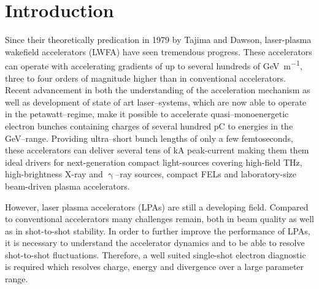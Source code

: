 \documentclass[%
preprint,
amsmath,
amssymb,
aip,
rsi, 
numerical,
floatfix,
]{revtex4-1}
\newcommand{\myCite}[1]{\textcolor{blue}{\cite{#1}}}
\begin{document}
\maketitle



\section{\label{Mot} Introduction}

Since their theoretically predication in 1979 by Tajima and Dawson\myCite{Tajima1979}, laser-plasma wakefield accelerators (LWFA) have seen tremendous progress. 
These accelerators can operate with accelerating gradients of up to several hundreds of \si{\giga\electronvolt\per\meter}, three to four orders of magnitude higher than in conventional accelerators.  
Recent advancement in both the understanding of the acceleration mechanism as well as development of state of art laser--systems, which are now able to operate in the petawatt--regime\myCite{Schramm2017, Gaul2010}, make it possible to accelerate quasi--monoenergetic\myCite{Geddes2004, Faure2004, Mangles2004} electron bunches containing charges of several hundred \si{\pico\coulomb} to energies in the \si{\giga\electronvolt}--range\myCite{Leemans2014, Schroeder2007, Wang2013}.
Providing ultra--short bunch lengths of only a few femtoseconds, these accelerators can deliver several tens of kA peak-current \myCite{Couperus2017, Li2017} making them them ideal drivers for next-generation compact light-sources covering high-field THz\myCite{Leemans2003,Green2016}, high-brightness X-ray\myCite{Jochmann2013,Powers2014} and $\upgamma$--ray\myCite{TaPhuoc2012,Sarri2014} sources, compact FELs\myCite{Schlenvoigt2007,Fuchs2009,Maier2012,Huang2012,Steiniger2014} and laboratory-size beam-driven plasma accelerators\myCite{MartinezDelaOssa2013,MartinezDeLaOssa2015}.

However, laser plasma accelerators (LPAs) are still a developing field. 
Compared to conventional accelerators many challenges remain, both in beam quality as well as in shot-to-shot stability.
In order to further improve the performance of LPAs, it is necessary to understand the accelerator dynamics and to be able to resolve shot-to-shot fluctuations. 
Therefore, a well suited single-shot electron diagnostic is required which resolves charge, energy and divergence over a large parameter range. 
\end{document}
